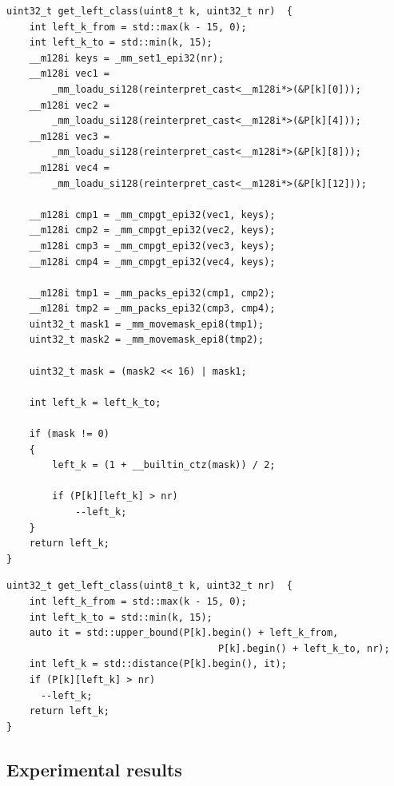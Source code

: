 \begin{lstlisting}
uint32_t get_left_class(uint8_t k, uint32_t nr)  {
	int left_k_from = std::max(k - 15, 0);
	int left_k_to = std::min(k, 15);
	__m128i keys = _mm_set1_epi32(nr);
	__m128i vec1 =
		_mm_loadu_si128(reinterpret_cast<__m128i*>(&P[k][0]));
	__m128i vec2 =
		_mm_loadu_si128(reinterpret_cast<__m128i*>(&P[k][4]));
	__m128i vec3 =
		_mm_loadu_si128(reinterpret_cast<__m128i*>(&P[k][8]));
	__m128i vec4 =
		_mm_loadu_si128(reinterpret_cast<__m128i*>(&P[k][12]));

	__m128i cmp1 = _mm_cmpgt_epi32(vec1, keys);
	__m128i cmp2 = _mm_cmpgt_epi32(vec2, keys);
	__m128i cmp3 = _mm_cmpgt_epi32(vec3, keys);
	__m128i cmp4 = _mm_cmpgt_epi32(vec4, keys);

	__m128i tmp1 = _mm_packs_epi32(cmp1, cmp2);
	__m128i tmp2 = _mm_packs_epi32(cmp3, cmp4);
	uint32_t mask1 = _mm_movemask_epi8(tmp1);
	uint32_t mask2 = _mm_movemask_epi8(tmp2);

	uint32_t mask = (mask2 << 16) | mask1;

	int left_k = left_k_to;

	if (mask != 0)
	{
		left_k = (1 + __builtin_ctz(mask)) / 2;

		if (P[k][left_k] > nr)
			--left_k;
	}
	return left_k;
}
\end{lstlisting}

\begin{lstlisting}
uint32_t get_left_class(uint8_t k, uint32_t nr)  {
	int left_k_from = std::max(k - 15, 0);
	int left_k_to = std::min(k, 15);
	auto it = std::upper_bound(P[k].begin() + left_k_from,
                                     P[k].begin() + left_k_to, nr);
    int left_k = std::distance(P[k].begin(), it);
    if (P[k][left_k] > nr)
      --left_k;
	return left_k;
}
\end{lstlisting}

\subsection{Experimental results}

